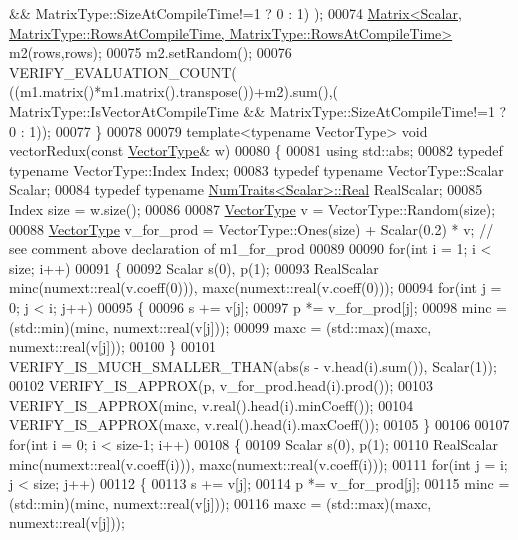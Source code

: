 \begin{DoxyCode}
      && MatrixType::SizeAtCompileTime!=1 ? 0 : 1) );
00074   \hyperlink{group___core___module_class_eigen_1_1_matrix}{Matrix<Scalar, MatrixType::RowsAtCompileTime, MatrixType::RowsAtCompileTime>}
       m2(rows,rows);
00075   m2.setRandom();
00076   VERIFY\_EVALUATION\_COUNT( ((m1.matrix()*m1.matrix().transpose())+m2).sum(),(
      MatrixType::IsVectorAtCompileTime && MatrixType::SizeAtCompileTime!=1 ? 0 : 1));
00077 \}
00078 
00079 \textcolor{keyword}{template}<\textcolor{keyword}{typename} VectorType> \textcolor{keywordtype}{void} vectorRedux(\textcolor{keyword}{const} \hyperlink{struct_vector_type}{VectorType}& w)
00080 \{
00081   \textcolor{keyword}{using} std::abs;
00082   \textcolor{keyword}{typedef} \textcolor{keyword}{typename} VectorType::Index Index;
00083   \textcolor{keyword}{typedef} \textcolor{keyword}{typename} VectorType::Scalar Scalar;
00084   \textcolor{keyword}{typedef} \textcolor{keyword}{typename} \hyperlink{group___core___module_struct_eigen_1_1_num_traits}{NumTraits<Scalar>::Real} RealScalar;
00085   Index size = w.size();
00086 
00087   \hyperlink{struct_vector_type}{VectorType} v = VectorType::Random(size);
00088   \hyperlink{struct_vector_type}{VectorType} v\_for\_prod = VectorType::Ones(size) + Scalar(0.2) * v; \textcolor{comment}{// see comment above
       declaration of m1\_for\_prod}
00089 
00090   \textcolor{keywordflow}{for}(\textcolor{keywordtype}{int} i = 1; i < size; i++)
00091   \{
00092     Scalar s(0), p(1);
00093     RealScalar minc(numext::real(v.coeff(0))), maxc(numext::real(v.coeff(0)));
00094     \textcolor{keywordflow}{for}(\textcolor{keywordtype}{int} j = 0; j < i; j++)
00095     \{
00096       s += v[j];
00097       p *= v\_for\_prod[j];
00098       minc = (std::min)(minc, numext::real(v[j]));
00099       maxc = (std::max)(maxc, numext::real(v[j]));
00100     \}
00101     VERIFY\_IS\_MUCH\_SMALLER\_THAN(abs(s - v.head(i).sum()), Scalar(1));
00102     VERIFY\_IS\_APPROX(p, v\_for\_prod.head(i).prod());
00103     VERIFY\_IS\_APPROX(minc, v.real().head(i).minCoeff());
00104     VERIFY\_IS\_APPROX(maxc, v.real().head(i).maxCoeff());
00105   \}
00106 
00107   \textcolor{keywordflow}{for}(\textcolor{keywordtype}{int} i = 0; i < size-1; i++)
00108   \{
00109     Scalar s(0), p(1);
00110     RealScalar minc(numext::real(v.coeff(i))), maxc(numext::real(v.coeff(i)));
00111     \textcolor{keywordflow}{for}(\textcolor{keywordtype}{int} j = i; j < size; j++)
00112     \{
00113       s += v[j];
00114       p *= v\_for\_prod[j];
00115       minc = (std::min)(minc, numext::real(v[j]));
00116       maxc = (std::max)(maxc, numext::real(v[j]));

\end{DoxyCode}
